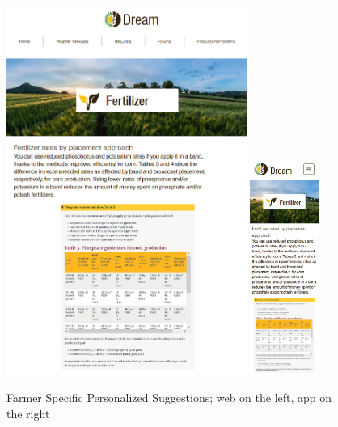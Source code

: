 \documentclass{article}
\begin{document}
        \begin{figure} [h]
            \centering
            \includegraphics[width=0.7\textwidth]{images/UserInterfaces/Farmer/PersonalizedSuggestions/SpecificSuggestionWeb.png}
            \quad
            \includegraphics[width=0.2\textwidth]{images/UserInterfaces/Farmer/PersonalizedSuggestions/SpecificSuggestionApp.png}
            \quad
            \caption{\label{fig:farmerPersonalizedSuggestionsSpecific}Farmer Specific Personalized Suggestions; web on the left, app on the right}
        \end{figure}
        \newpage
        
\end{document}
